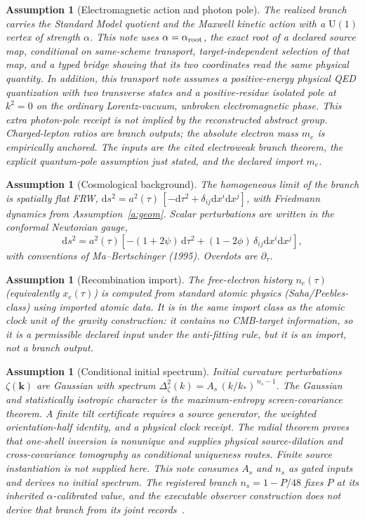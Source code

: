 \documentclass[11pt]{article}
\newtheorem{assumption}[theorem]{Assumption}
\theoremstyle{remark}
\newcommand{\Dd}{\mathrm{d}}
\begin{document}
\begin{assumption}[Electromagnetic action and photon pole]\label{a:qed}
The realized branch carries the Standard Model quotient and the Maxwell
kinetic action with a $\mathrm U(1)$ vertex of strength $\alpha$. This note
uses $\alpha=\alpha_{\rm root}$, the exact root of a declared source map,
conditional on same-scheme transport, target-independent selection of that
map, and a typed bridge showing that its two coordinates read the same
physical quantity. In addition, this transport note
assumes a positive-energy physical QED quantization with two transverse
states and a positive-residue isolated pole at $k^2=0$ on the ordinary
Lorentz-vacuum, unbroken electromagnetic phase. This extra photon-pole
receipt is not implied by the reconstructed abstract group. Charged-lepton
\emph{ratios} are branch outputs; the absolute electron mass $m_e$ is
empirically anchored. The inputs are the cited electroweak branch theorem,
the explicit quantum-pole assumption just stated, and the declared import
$m_e$.
\end{assumption}

\begin{assumption}[Cosmological background]\label{a:bg}
The homogeneous limit of the branch is spatially flat FRW,
$\Dd s^2=a^2(\tau)\,[-\Dd\tau^2+\delta_{ij}\Dd x^i\Dd x^j]$, with Friedmann
dynamics from Assumption~\ref{a:geom}. Scalar perturbations are written in
the conformal Newtonian gauge,
\[
\Dd s^2=a^2(\tau)\left[-(1+2\psi)\,\Dd\tau^2+(1-2\phi)\,\delta_{ij}\Dd
x^i\Dd x^j\right],
\]
with conventions of Ma--Bertschinger (1995). Overdots are $\partial_\tau$.
\end{assumption}

\begin{assumption}[Recombination import]\label{a:rec}
The free-electron history $n_e(\tau)$ (equivalently $x_e(\tau)$) is computed
from standard atomic physics (Saha/Peebles-class) using imported atomic data.
It is in the same import class as the atomic clock unit of the gravity
construction: it contains no CMB-target information, so it is a permissible declared input
under the anti-fitting rule, but it is an import, not a branch output.
\end{assumption}

\begin{assumption}[Conditional initial spectrum]\label{a:init}
Initial curvature perturbations $\zeta(\mathbf k)$ are Gaussian with spectrum
$\Delta^2_\zeta(k)=A_s\,(k/k_\ast)^{\,n_s-1}$. The Gaussian and
statistically isotropic character is the maximum-entropy screen-covariance
theorem. A finite tilt certificate requires a source generator, the weighted
orientation-half identity, and a physical clock receipt. The radial theorem
proves that one-shell inversion is nonunique and supplies physical
source-dilation and cross-covariance tomography as conditional uniqueness
routes. Finite source instantiation is not supplied here. This note consumes
\(A_s\) and \(n_s\) as gated inputs and derives no initial spectrum. The
registered branch \(n_s=1-P/48\) fixes \(P\) at its inherited
\(\alpha\)-calibrated value, and the executable observer construction does
not derive that branch from its joint records~\cite{ophpublicdata}.
\end{assumption}
\end{document}
